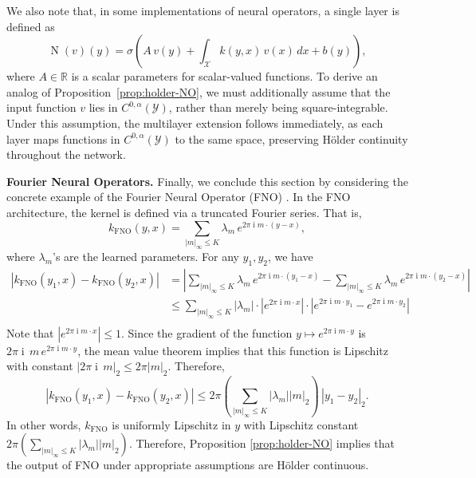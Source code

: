 \documentclass[11pt]{article}
\theoremstyle{plain}
\newcommand{\Ycal}{\mathcal{Y}}
\begin{document}
We also note that, in some implementations of neural operators, a single layer is defined as
\[
\operatorname{N}(v)(y) = \sigma \left( A\,v(y) + \int_{\mathcal{X}} k(y, x)\, v(x)\, dx + b(y) \right),
\]
where $ A \in \mathbb{R} $ is a scalar parameters for scalar-valued functions. To derive an analog of Proposition~\ref{prop:holder-NO}, we must additionally assume that the input function $ v $ lies in $ C^{0,\alpha}(\Ycal) $, rather than merely being square-integrable. Under this assumption, the multilayer extension follows immediately, as each layer maps functions in $ C^{0,\alpha}(\Ycal) $ to the same space, preserving H{\" o}lder continuity throughout the network.

\medskip 

\noindent \textbf{Fourier Neural Operators.}
Finally, we conclude this section by considering the concrete example of the Fourier Neural Operator (FNO) \citep{li2020fourier}. In the FNO architecture, the kernel is defined via a truncated Fourier series. That is,
\[k_{\text{FNO}}(y,x) = \sum_{|m|_{\infty}\leq K} \lambda_m \, e^{2\pi \operatorname{i} m \cdot (y-x) },\]
where $\lambda_m$'s are the learned parameters. For any $y_1,y_2$, we have
\begin{equation*}
    \begin{split}
     |k_{\text{FNO}}(y_1,x)-k_{\text{FNO}}(y_2,x)| 
     &=   \left|\sum_{|m|_{\infty}\leq K} \lambda_m \, e^{2\pi \operatorname{i} m \cdot (y_1-x) }- \sum_{|m|_{\infty}\leq K} \lambda_m \, e^{2\pi \operatorname{i} m \cdot (y_2-x) } \right|\\
     &\leq \sum_{|m|_{\infty}\leq K} |\lambda_m|\cdot |e^{2\pi \operatorname{i}m\cdot x}| \cdot |e^{2\pi \operatorname{i} m \cdot y_1 }-e^{2\pi \operatorname{i} m \cdot y_2} |\\
    \end{split}
\end{equation*}
Note that $|e^{2\pi \operatorname{i}m\cdot x}| \leq 1$. Since the gradient of the function $y \mapsto e^{2\pi \operatorname{i}m\cdot y}$ is $ 2\pi \operatorname{i}\, m \, e^{2\pi \operatorname{i}m\cdot y}$, the mean value theorem implies that this function is Lipschitz with constant  $|2\pi \operatorname{i}\, m|_2 \leq 2\pi |m|_2$. Therefore, 
\[|k_{\text{FNO}}(y_1,x)-k_{\text{FNO}}(y_2,x)| \leq 2\pi \left( \sum_{|m|_{\infty}\leq K} |\lambda_m| |m|_2 \right) \, |y_1-y_2|_2. \]
In other words, $k_{\text{FNO}}$ is uniformly Lipschitz in $y$ with Lipschitz constant $2\pi \left( \sum_{|m|_{\infty}\leq K} |\lambda_m| |m|_2 \right)$. Therefore, Proposition \ref{prop:holder-NO} implies that the output of FNO under appropriate assumptions are H{\" o}lder continuous.
\end{document}
